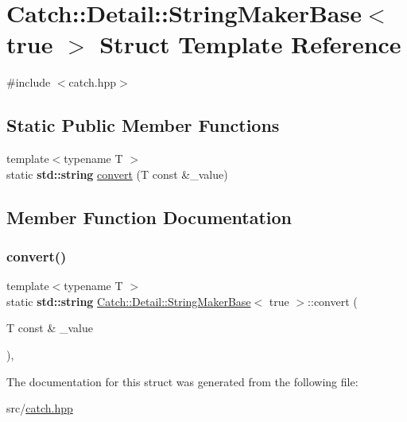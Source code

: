 \hypertarget{struct_catch_1_1_detail_1_1_string_maker_base_3_01true_01_4}{}\section{Catch\+:\+:Detail\+:\+:String\+Maker\+Base$<$ true $>$ Struct Template Reference}
\label{struct_catch_1_1_detail_1_1_string_maker_base_3_01true_01_4}


{\ttfamily \#include $<$catch.\+hpp$>$}

\subsection*{Static Public Member Functions}
\begin{DoxyCompactItemize}
\item 
{\footnotesize template$<$typename T $>$ }\\static \textbf{ std\+::string} \hyperlink{struct_catch_1_1_detail_1_1_string_maker_base_3_01true_01_4_af9b5fdf7fddd8c5c873caa819e5f00f6}{convert} (T const \&\+\_\+value)
\end{DoxyCompactItemize}


\subsection{Member Function Documentation}
\mbox{\label{struct_catch_1_1_detail_1_1_string_maker_base_3_01true_01_4_af9b5fdf7fddd8c5c873caa819e5f00f6}} 
\subsubsection{\texorpdfstring{convert()}{convert()}}
{\footnotesize\ttfamily template$<$typename T $>$ \\
static \textbf{ std\+::string} \hyperlink{struct_catch_1_1_detail_1_1_string_maker_base}{Catch\+::\+Detail\+::\+String\+Maker\+Base}$<$ true $>$\+::convert (\begin{DoxyParamCaption}\item[{T const \&}]{\+\_\+value }\end{DoxyParamCaption})\hspace{0.3cm}{\ttfamily [inline]}, {\ttfamily [static]}}



The documentation for this struct was generated from the following file\+:\begin{DoxyCompactItemize}
\item 
src/\hyperlink{catch_8hpp}{catch.\+hpp}\end{DoxyCompactItemize}
